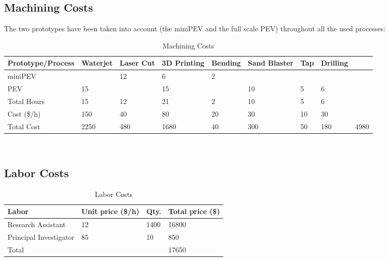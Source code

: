 \subsection{Machining Costs}

The two prototypes have been taken into account (the miniPEV and the full scale PEV) throughout all the used processes:

\begin{table*}[h!]
\centering
	\begin{tabular}{l|lllllll|l}
	\hline
	\textbf{Prototype/Process} & \textbf{Waterjet} & \textbf{Laser Cut} & \textbf{3D Printing} & \textbf{Bending} & \textbf{Sand Blaster} & \textbf{Tap} & \textbf{Drilling} &      \\
	\hline
	miniPEV           &          & 12        & 6           & 2       &              &     &          &      \\
	PEV               & 15       &           & 15          &         & 10           & 5   & 6        &      \\
	\hline
	Total Hours       & 15       & 12        & 21          & 2       & 10           & 5   & 6        &      \\
	Cost (\$/h)       & 150      & 40        & 80          & 20      & 30           & 10  & 30       &      \\
	\hline
	Total Cost        & 2250     & 480       & 1680        & 40      & 300          & 50  & 180      & 4980 \\
	\hline
	\end{tabular}
	\\[20pt]
	\caption{Machining Costs}
\end{table*}


\subsection{Labor Costs}

\begin{table}[h]
\centering
	\begin{tabular}{llll}
		\hline
		\textbf{Labor} & \textbf{Unit price (\$/h)} & \textbf{Qty}. & \textbf{Total price (\$)} \\
		\hline
		Research Assistant     & 12                & 1400 & 16800            \\
		Principal Investigator & 85                & 10   & 850              \\
		\hline
		Total                  &                   &      & 17650           \\
		\hline
	\end{tabular}
\caption{Labor Costs}
\\[20pt]
\end{table}

